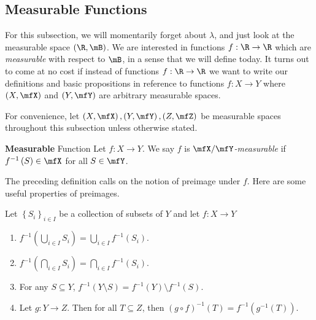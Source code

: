 \documentclass[pmath450]{subfiles}
\begin{document}
    \subsection{Measurable Functions}
    
    \np For this subsection, we will momentarily forget about $\lambda$, and just look at the measurable space $\left( \R,\mB \right)$. We are interested in functions $f:\R\to\R$ which are \textit{measurable} with respect to $\mB$, in a sense that we will define today. It turns out to come at no cost if instead of functions $f:\R\to\R$ we want to write our definitions and basic propositions in reference to functions $f:X\to Y$ where $\left( X,\mfX \right)$ and $\left( Y,\mfY \right)$ are arbitrary measurable spaces.

    \np For convenience, let $\left( X,\mfX \right), \left( Y,\mfY \right), \left( Z,\mfZ \right)$ be measurable spaces throughout this subsection unless otherwise stated.

    \begin{definition}{\textbf{Measurable} Function}
        Let $f:X\to Y$. We say $f$ is \emph{$\mfX /\mfY$-measurable} if $f^{-1}\left( S \right)\in\mfX$ for all $S\in\mfY$.
    \end{definition}

    \np The preceding definition calls on the notion of preimage under $f$. Here are some useful properties of preimages.

    \begin{prop}{}
        Let $\left\lbrace S_i \right\rbrace^{}_{i\in I}$ be a collection of subsets of $Y$ and let $f:X\to Y$
        \begin{enumerate}
            \item $f^{-1}\left( \bigcup^{}_{i\in I}S_i \right)=\bigcup^{}_{i\in I}f^{-1}\left( S_i \right)$.
            \item $f^{-1}\left( \bigcap^{}_{i\in I}S_i \right)=\bigcap^{}_{i\in I}f^{-1}\left( S_i \right)$.
            \item For any $S\subseteq Y$, $f^{-1}\left( Y\setminus S \right) = f^{-1}\left( Y \right)\setminus f^{-1}\left( S \right)$.
            \item Let $g:Y\to Z$. Then for all $T\subseteq Z$, then $\left( g\circ f \right)^{-1}\left( T \right) = f^{-1}\left( g^{-1}\left( T \right) \right)$.
        \end{enumerate}
    \end{prop}

\end{document}
